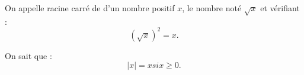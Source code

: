 \documentclass[a4paper,12pt]{report}
\newcommand{\abs}[1]{\lvert#1\rvert}%
\begin{document}
On appelle racine carré de d'un
 nombre positif $x$, le nombre
  noté $\sqrt{x}$ et vérifiant : 
\[(\sqrt{x})^2=x.\]

On sait que : \[\abs{x}=x si x\geq 0.\]
\end{document}
